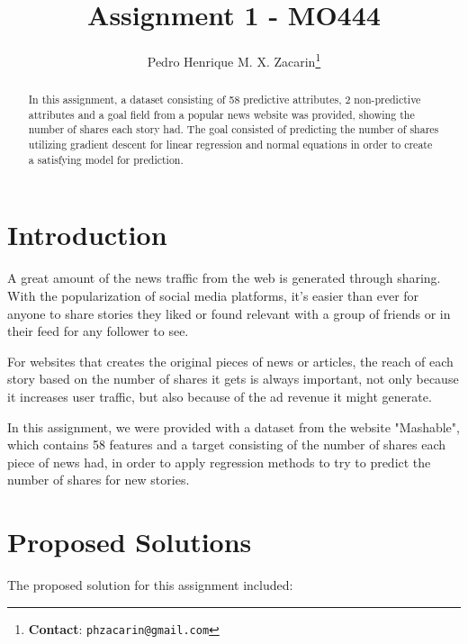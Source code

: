 \documentclass[10pt,twocolumn,letterpaper]{article}
\begin{document}
\title{Assignment 1 - MO444}
\author{Pedro Henrique M. X. Zacarin\thanks{\textbf{Contact}: \tt\small{phzacarin@gmail.com}}\\
}

\maketitle
\begin{abstract}
In this assignment, a dataset consisting of 58 predictive attributes, 2 non-predictive attributes and
a goal field from a popular news website was provided, showing the number of shares each story had. The goal consisted of
predicting the number of shares utilizing gradient descent for linear regression and normal equations in order to create a satisfying
model for prediction.
\end{abstract}

\section{Introduction}
A great amount of the news traffic from the web is generated through sharing. With the popularization of social media
platforms, it's easier than ever for anyone to share stories they liked or found relevant with a group of friends or in their feed for any follower to see.

For websites that creates the original pieces of news or articles, the reach of each story based on the number of shares it gets is always important, not only because it increases user traffic, but also because of the ad revenue it might generate.

In this assignment, we were provided with a dataset from the website "Mashable", which contains 58 features and a target consisting of the number of shares each piece of news had, in order to apply regression methods to try to predict the number of shares for new stories.

\section{Proposed Solutions}
The proposed solution for this assignment included:
\end{document}
